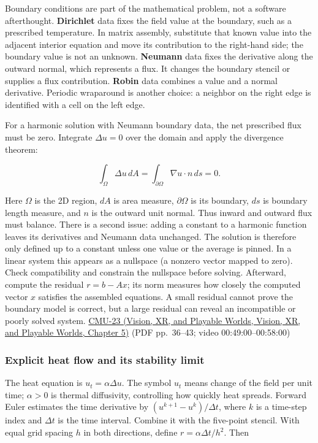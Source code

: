 Boundary conditions are part of the mathematical problem, not a software afterthought. \textbf{Dirichlet} data fixes the field value at the boundary, such as a prescribed temperature. In matrix assembly, substitute that known value into the adjacent interior equation and move its contribution to the right-hand side; the boundary value is not an unknown. \textbf{Neumann} data fixes the derivative along the outward normal, which represents a flux. It changes the boundary stencil or supplies a flux contribution. \textbf{Robin} data combines a value and a normal derivative. Periodic wraparound is another choice: a neighbor on the right edge is identified with a cell on the left edge.

For a harmonic solution with Neumann boundary data, the net prescribed flux must be zero. Integrate \(\Delta u=0\) over the domain and apply the divergence theorem:

\[
\int_\Omega \Delta u\,dA
=\int_{\partial\Omega}\nabla u\cdot n\,ds
=0.
\]

Here \(\Omega\) is the 2D region, \(dA\) is area measure, \(\partial\Omega\) is its boundary, \(ds\) is boundary length measure, and \(n\) is the outward unit normal. Thus inward and outward flux must balance. There is a second issue: adding a constant to a harmonic function leaves its derivatives and Neumann data unchanged. The solution is therefore only defined up to a constant unless one value or the average is pinned. In a linear system this appears as a nullspace (a nonzero vector mapped to zero). Check compatibility and constrain the nullspace before solving. Afterward, compute the residual \(r=b-Ax\); its norm measures how closely the computed vector \(x\) satisfies the assembled equations. A small residual cannot prove the boundary model is correct, but a large residual can reveal an incompatible or poorly solved system. \href{../07-Vision-XR-and-Playable-Worlds/main.pdf\#nameddest=04-visual-computing-ii-ch036-cmu-23---physically-based-animation-and-pdes}{CMU-23 (Vision, XR, and Playable Worlds, Vision, XR, and Playable Worlds, Chapter 5)} (PDF pp.~36--43; video 00:49:00--00:58:00)

\subsubsection{Explicit heat flow and its stability limit}\label{04-visual-computing-ii-ch030-explicit-heat-flow-and-its-stability-limit}

The heat equation is \(u_t=\alpha\Delta u\). The symbol \(u_t\) means change of the field per unit time; \(\alpha>0\) is thermal diffusivity, controlling how quickly heat spreads. Forward Euler estimates the time derivative by \((u^{k+1}-u^k)/\Delta t\), where \(k\) is a time-step index and \(\Delta t\) is the time interval. Combine it with the five-point stencil. With equal grid spacing \(h\) in both directions, define \(r=\alpha\Delta t/h^2\). Then

